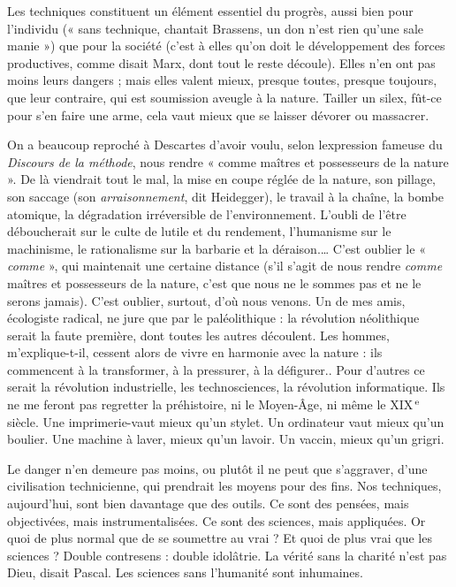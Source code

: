 Les techniques constituent un élément essentiel du progrès, aussi bien pour
l'individu (« sans technique, chantait Brassens, un don n’est rien qu’une sale
manie ») que pour la société (c’est à elles qu’on doit le développement des
forces productives, comme disait Marx, dont tout le reste découle). Elles n’en
ont pas moins leurs dangers ; mais elles valent mieux, presque toutes, presque
toujours, que leur contraire, qui est soumission aveugle à la nature. Tailler un
silex, fût-ce pour s’en faire une arme, cela vaut mieux que se laisser dévorer ou
massacrer.

On a beaucoup reproché à Descartes d’avoir voulu, selon lexpression
fameuse du {\it Discours de la méthode}, nous rendre « comme maîtres et possesseurs
de la nature ». De là viendrait tout le mal, la mise en coupe réglée de la nature,
son pillage, son saccage (son {\it arraisonnement}, dit Heidegger), le travail à la
chaîne, la bombe atomique, la dégradation irréversible de l’environnement.
L’oubli de l’être déboucherait sur le culte de lutile et du rendement, l’humanisme
sur le machinisme, le rationalisme sur la barbarie et la déraison.… C’est
oublier le « {\it comme} », qui maintenait une certaine distance (s’il s’agit de nous
rendre {\it comme} maîtres et possesseurs de la nature, c’est que nous ne le sommes
pas et ne le serons jamais). C’est oublier, surtout, d’où nous venons. Un de mes
amis, écologiste radical, ne jure que par le paléolithique : la révolution néolithique
serait la faute première, dont toutes les autres découlent. Les hommes,
m’explique-t-il, cessent alors de vivre en harmonie avec la nature : ils commencent
à la transformer, à la pressurer, à la défigurer.. Pour d’autres ce serait la
révolution industrielle, les technosciences, la révolution informatique. Ils ne
me feront pas regretter la préhistoire, ni le Moyen-Âge, ni même le {\footnotesize XIX}$^\text{\,e}$ siècle.
Une imprimerie-vaut mieux qu’un stylet. Un ordinateur vaut mieux qu’un
boulier. Une machine à laver, mieux qu’un lavoir. Un vaccin, mieux qu’un
grigri.

Le danger n’en demeure pas moins, ou plutôt il ne peut que s’aggraver,
d’une civilisation technicienne, qui prendrait les moyens pour des fins. Nos
techniques, aujourd’hui, sont bien davantage que des outils. Ce sont des pensées,
mais objectivées, mais instrumentalisées. Ce sont des sciences, mais appliquées.
Or quoi de plus normal que de se soumettre au vrai ? Et quoi de plus
vrai que les sciences ? Double contresens : double idolâtrie. La vérité sans la
charité n’est pas Dieu, disait Pascal. Les sciences sans l'humanité sont inhumaines.

